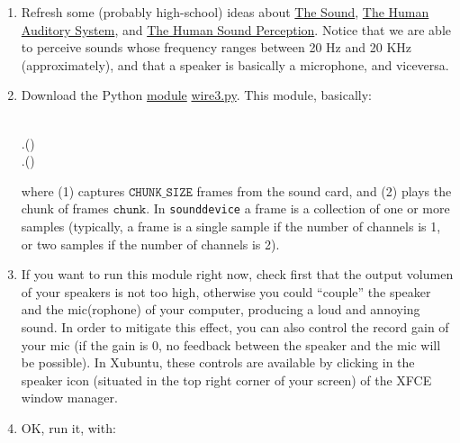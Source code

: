 \begin{enumerate}

\item Refresh some (probably high-school) ideas about
  \href{https://vicente-gonzalez-ruiz.github.io/the_sound/}{The
    Sound}, \href{https://vicente-gonzalez-ruiz.github.io/human_auditory_system/}{The
    Human Auditory System},
    and \href{https://vicente-gonzalez-ruiz.github.io/human_sound_perception/}{The
    Human Sound Perception}. Notice that we are able to perceive
    sounds whose frequency ranges between 20 Hz and 20 KHz
    (approximately), and that a speaker is basically a microphone, and
    viceversa.
  
\item Download the Python
  \href{https://docs.python.org/3/tutorial/modules.html}{module}
  \href{https://raw.githubusercontent.com/Tecnologias-multimedia/intercom/master/test/sounddevice/wire3.py}{wire3.py}. This module, basically:
  
  \begin{pseudocode}[display]{}{}
    \BEGIN
       \\
      \WHILE \TRUE
      \BEGIN
         \GETS {}.() \\
        .() 
      \END
    \END
  \end{pseudocode}

  where (1) captures $\mathtt{CHUNK\_SIZE}$ frames from the sound
  card, and (2) plays the chunk of frames
  $\mathtt{chunk}$. In \texttt{sounddevice} a frame is a collection of
  one or more samples (typically, a frame is a single sample if the
  number of channels is 1, or two samples if the number of channels is
  2).

\item If you want to run this module right now, check first that the
  output volumen of your speakers is not too high, otherwise you could
  ``couple'' the speaker and the mic(rophone) of your computer,
  producing a loud and annoying sound. In order to mitigate this
  effect, you can also control the record gain of your mic (if the
  gain is 0, no feedback between the speaker and the mic will be
  possible). In Xubuntu, these controls are available by clicking in
  the speaker icon (situated in the top right corner of your screen)
  of the XFCE window manager.

\item OK, run it, with:


\end{enumerate}
